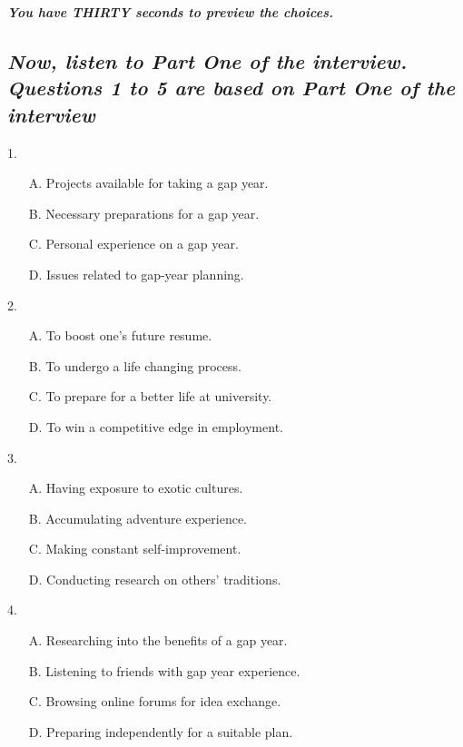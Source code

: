 \documentclass[UTF8,11pt]{ctexart}
\begin{document}
\textbf{\textit{You have THIRTY seconds to preview the choices.}}


\subsection*{\textbf{\textit{Now, listen to Part One of the interview. Questions 1 to 5 are based on Part One of the interview}}}


1.


\begin{itemize}[leftmargin=2em,itemsep=.2em,topsep=.4em]\item[A.] Projects available for taking a gap year.
\item[B.] Necessary preparations for a gap year.
\item[C.] Personal experience on a gap year.
\item[D.] Issues related to gap-year planning.
\end{itemize}

2.


\begin{itemize}[leftmargin=2em,itemsep=.2em,topsep=.4em]\item[A.] To boost one’s future resume.
\item[B.] To undergo a life changing process.
\item[C.] To prepare for a better life at university.
\item[D.] To win a competitive edge in employment.
\end{itemize}

3.


\begin{itemize}[leftmargin=2em,itemsep=.2em,topsep=.4em]\item[A.] Having exposure to exotic cultures.
\item[B.] Accumulating adventure experience.
\item[C.] Making constant self-improvement.
\item[D.] Conducting research on others’ traditions.
\end{itemize}

4.


\begin{itemize}[leftmargin=2em,itemsep=.2em,topsep=.4em]\item[A.] Researching into the benefits of a gap year.
\item[B.] Listening to friends with gap year experience.
\item[C.] Browsing online forums for idea exchange.
\item[D.] Preparing independently for a suitable plan.
\end{itemize}
\end{document}
